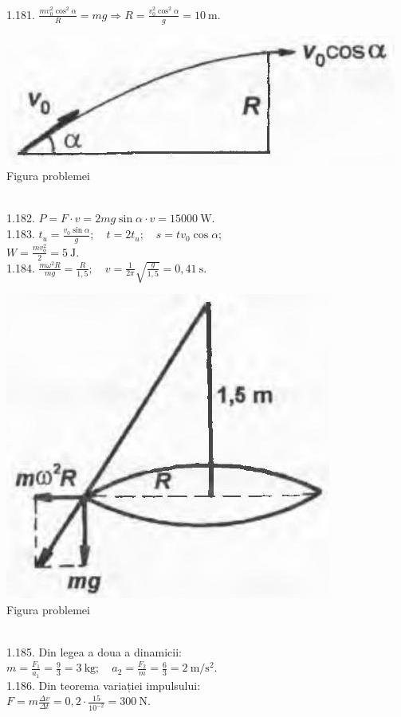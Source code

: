 1.181. $\frac{m v_{0}^{2} \cos ^{2} \alpha}{R}=m g \Rightarrow R=\frac{v_{0}^{2} \cos ^{2} \alpha}{g}=10 \mathrm{~m}$.\\ \begin{center} \includegraphics[width=0.4\linewidth]{images/2025_07_01_5b3ff9fa0d508c8e9f17g-239(1)}\\ Figura problemei \end{center}\\

1.182. $P=F \cdot v=2 m g \sin \alpha \cdot v=15000 \mathrm{~W}$.\\

1.183. $t_{u}=\frac{v_{0} \sin \alpha}{g}; \quad t=2 t_{u}; \quad s=t v_{0} \cos \alpha$;\\ $W=\frac{m v_{0}^{2}}{2}=5 \mathrm{~J}$.\\

1.184. $\frac{m \omega^{2} R}{m g}=\frac{R}{1,5}; \quad v=\frac{1}{2 \pi} \sqrt{\frac{g}{1,5}}=0,41 \mathrm{~s}$.\\ \begin{center} \includegraphics[width=0.4\linewidth]{images/2025_07_01_5b3ff9fa0d508c8e9f17g-239(2)}\\ Figura problemei \end{center}\\

1.185. Din legea a doua a dinamicii:\\ $m=\frac{F_{1}}{a_{1}}=\frac{9}{3}=3 \mathrm{~kg}; \quad a_{2}=\frac{F_{2}}{m}=\frac{6}{3}=2 \mathrm{~m} / \mathrm{s}^{2}$.\\

1.186. Din teorema variației impulsului:\\ $F=m \frac{\Delta v}{\Delta t}=0,2 \cdot \frac{15}{10^{-2}}=300 \mathrm{~N}$.\\

